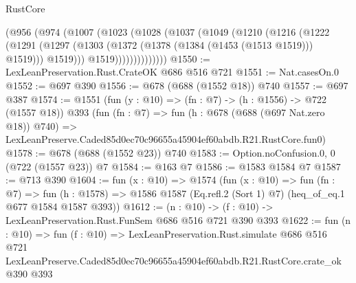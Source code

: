 \begin{lexlean}{RustCore}
\begin{coremodule}
              (@956
                (@974
                  (@1007
                    (@1023
                      (@1028
                        (@1037
                          (@1049
                            (@1210
                              (@1216
                                (@1222
                                  (@1291
                                    (@1297
                                      (@1303 (@1372 (@1378 (@1384 (@1453 (@1513 @1519))) @1519)))
                                      @1519)))
                                @1519))))))))))))))
@1550 := LexLeanPreservation.Rust.CrateOK @686 @516 @721
@1551 := Nat.casesOn.{0}
@1552 := @697 @390
@1556 := @678 (@688 (@1552 @18)) @740
@1557 := @697 @387
@1574 := @1551
    (fun (y : @10) => (fn : @7) -> (h : @1556) -> @722 (@1557 @18))
    @393
    (fun (fn : @7) =>
    fun (h : @678 (@688 (@697 Nat.zero @18)) @740) =>
    LexLeanPreserve.Caded85d0ec70c96655a45904ef60abdb.R21.RustCore.fun0)
@1578 := @678 (@688 (@1552 @23)) @740
@1583 := Option.noConfusion.{0, 0} (@722 (@1557 @23)) @7
@1584 := @163 @7
@1586 := @1583 @1584 @7
@1587 := @713 @390
@1604 := fun (x : @10) =>
  @1574
    (fun (x : @10) =>
    fun (fn : @7) =>
    fun (h : @1578) => @1586 @1587 (Eq.refl.{2} (Sort 1) @7) (heq_of_eq.{1} @677 @1584 @1587 @393))
@1612 := (n : @10) -> (f : @10) -> LexLeanPreservation.Rust.FunSem @686 @516 @721 @390 @393
@1622 := fun (n : @10) =>
  fun (f : @10) =>
  LexLeanPreservation.Rust.simulate
    @686
    @516
    @721
    LexLeanPreserve.Caded85d0ec70c96655a45904ef60abdb.R21.RustCore.crate_ok
    @390
    @393
\end{coremodule}
\end{lexlean}
